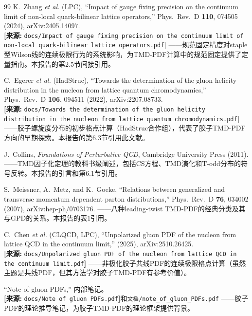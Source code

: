 \documentclass[12pt,a4paper]{ctexart}
\theoremstyle{definition}
\begin{document}
\begin{thebibliography}{99}
K.~Zhang \textit{et al.} (LPC),
``Impact of gauge fixing precision on the continuum limit of non-local quark-bilinear lattice operators,''
Phys.\ Rev.\ D \textbf{110}, 074505 (2024), arXiv:2405.14097.
\\\textbf{[来源:} \texttt{docs/Impact of gauge fixing precision on the continuum limit of non-local quark-bilinear lattice operators.pdf}\textbf{]}
——规范固定精度对staple型Wilson线的连续极限行为的系统影响，为TMD-PDF计算中的规范固定提供了定量指南。本报告的第2.5节间接引用。

C.~Egerer \textit{et al.} (HadStruc),
``Towards the determination of the gluon helicity distribution in the nucleon from lattice quantum chromodynamics,''
Phys.\ Rev.\ D \textbf{106}, 094511 (2022), arXiv:2207.08733.
\\\textbf{[来源:} \texttt{docs/Towards the determination of the gluon helicity distribution in the nucleon from lattice quantum chromodynamics.pdf}\textbf{]}
——胶子螺旋度分布的初步格点计算（HadStruc合作组），代表了胶子TMD-PDF方向的早期探索。本报告的第6.3节引用此文献。

J.~Collins,
\textit{Foundations of Perturbative QCD},
Cambridge University Press (2011).
——TMD因子化定理的教科书级阐述，包括CS方程、TMD演化和T-odd分布的符号反转。本报告的引言和第6.1节引用。

S.~Meissner, A.~Metz, and K.~Goeke,
``Relations between generalized and transverse momentum dependent parton distributions,''
Phys.\ Rev.\ D \textbf{76}, 034002 (2007), arXiv:hep-ph/0703176.
——八种leading-twist TMD-PDF的经典分类及其与GPD的关系。本报告的表1引用。

C.~Chen \textit{et al.} (CLQCD, LPC),
``Unpolarized gluon PDF of the nucleon from lattice QCD in the continuum limit,''
(2025), arXiv:2510.26425.
\\\textbf{[来源:} \texttt{docs/Unpolarized gluon PDF of the nucleon from lattice QCD in the continuum limit.pdf}\textbf{]}
——非极化胶子共线PDF的连续极限格点计算（虽然主题是共线PDF，但其方法学对胶子TMD-PDF有参考价值）。

``Note of gluon PDFs,'' 内部笔记。
\\\textbf{[来源:} \texttt{docs/Note of gluon PDFs.pdf}\textbf{]}和\texttt{文档/note\_of\_gluon\_PDFs.pdf}
——胶子PDF的理论推导笔记，为胶子TMD-PDF的理论框架提供背景。

\end{thebibliography}
\end{document}
